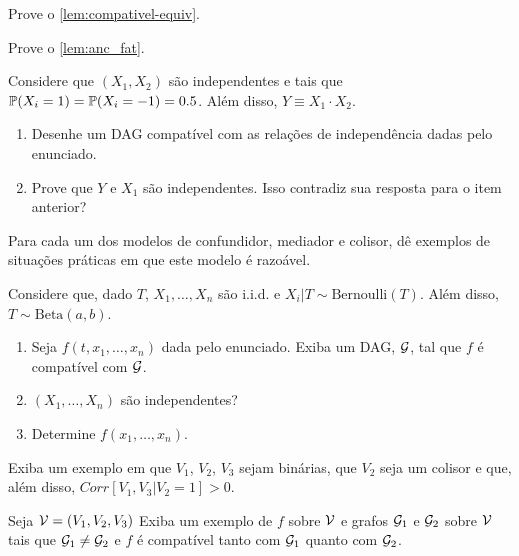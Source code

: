 \begin{exercise}
 Prove o \cref{lem:compativel-equiv}.
\end{exercise}

\begin{exercise}
 Prove o \cref{lem:anc_fat}.
\end{exercise}

\begin{exercise}
 Considere que $(X_1,X_2)$ são independentes e
 tais que $\P(X_i=1)=\P(X_i=-1)=0.5$.
 Além disso, $Y \equiv X_1 \cdot X_2$.
 \begin{enumerate}[label=(\alph*)]
  \item Desenhe um DAG compatível
  com as relações de independência dadas pelo enunciado.
  \item Prove que $Y$ e $X_1$ são independentes.
  Isso contradiz sua resposta para o item anterior?
 \end{enumerate}
\end{exercise}

\begin{exercise}
 Para cada um dos modelos de confundidor, mediador e colisor,
 dê exemplos de situações práticas em que este modelo é razoável.
\end{exercise}

\begin{exercise}
 Considere que, dado $T$, $X_1,\ldots,X_n$ são i.i.d. e
 $X_i|T \sim \text{Bernoulli}(T)$. Além disso,
 $T \sim \text{Beta}(a,b)$.
 \begin{enumerate}[label=(\alph*)]
  \item Seja $f(t,x_1,\ldots,x_n)$ dada pelo enunciado.
  Exiba um DAG, $\sG$, tal que $f$ é compatível com $\sG$.
  \item $(X_1,\ldots,X_n)$ são independentes?
  \item Determine $f(x_1,\ldots,x_n)$.
 \end{enumerate}
\end{exercise}

\begin{exercise}
 Exiba um exemplo em que $V_1$, $V_2$, $V_3$ sejam binárias,
 que $V_2$ seja um colisor e que, além disso,
 $Corr[V_1,V_3|V_2=1] > 0$.
\end{exercise}

\begin{exercise}
 Seja $\sV = (V_1, V_2, V_3)$
 Exiba um exemplo de $f$ sobre $\sV$ e
 grafos $\sG_1$ e $\sG_2$ sobre $\sV$ tais que
 $\sG_1 \neq \sG_2$ e
 $f$ é compatível tanto com $\sG_1$ 
 quanto com $\sG_2$.
\end{exercise}

